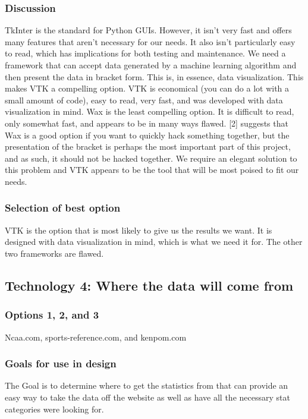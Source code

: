\documentclass[journal,onecolumn]{IEEEtran}
\begin{document}
\subsubsection{Discussion}
TkInter is the standard for Python GUIs. However, it isn't very fast and offers many features that aren't necessary for our needs. It also isn't particularly easy to read, which has implications for both testing and maintenance. We need a framework that can accept data generated by a machine learning algorithm and then present the data in bracket form. This is, in essence, data visualization. This makes VTK a compelling option. VTK is economical (you can do a lot with a small amount of code), easy to read, very fast, and was developed with data visualization in mind. Wax is the least compelling option. It is difficult to read, only somewhat fast, and appears to be in many ways flawed. [2] suggests that Wax is a good option if you want to quickly hack something together, but the presentation of the bracket is perhaps the most important part of this project, and as such, it should not be hacked together. We require an elegant solution to this problem and VTK appears to be the tool that will be most poised to fit our needs.
\subsubsection{Selection of best option}
VTK is the option that is most likely to give us the results we want. It is designed with data visualization in mind, which is what we need it for. The other two frameworks are flawed.






\subsection{Technology 4: Where the data will come from}

\subsubsection{Options 1, 2, and 3}
Ncaa.com, sports-reference.com, and kenpom.com 
\subsubsection{Goals for use in design}
The Goal is to determine where to get the statistics from that can provide an easy way to take the data off the website as well as have all the necessary stat categories were looking for.
\end{document}
